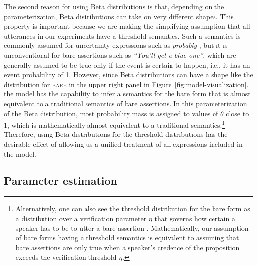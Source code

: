 \documentclass[man, floatsintext]{apa6}
\begin{document}
The second reason for using Beta distributions is that, depending on the parameterization, 
Beta distributions can take on very different shapes. This property is important because we are making
the simplifying assumption that all utterances in our experiments have a threshold semantics.
Such a semantics is commonly assumed for uncertainty expressions such as \textit{probably} \parencite[e.g.,][]{Yalcin2010,Lassiter2016}, 
but it is unconventional for bare assertions such as \textit{``You'll get a blue one''}, which are generally assumed to be  
true only if the event is certain to happen, i.e., it has an event probability of 1. However, since Beta distributions can have a shape 
like the distribution for \textsc{bare} in the upper right panel in Figure~\ref{fig:model-visualization}, the model has the capability to infer
a semantics for the bare form that is almost equivalent to a traditional semantics of bare assertions. In this parameterization of the
Beta distribution, most probability mass is assigned to values of $\theta$ close to 1, which is mathematically almost equivalent to
a traditional semantics.\footnote{Alternatively, one can also see the threshold distribution for the bare form as a distribution over a verification parameter $\eta$ that governs 
how certain a speaker has to be to utter a bare assertion \parencite[see, e.g.,][]{Moss2018}. Mathematically, our assumption of bare forms having a threshold
semantics is equivalent to assuming that bare assertions are only true when a speaker's credence of the proposition exceeds the verification threshold $\eta$.}
Therefore, using Beta distributions for the threshold distributions has the desirable effect of allowing us a unified treatment of all expressions included in the model. 

\subsection{Parameter estimation}
\end{document}

